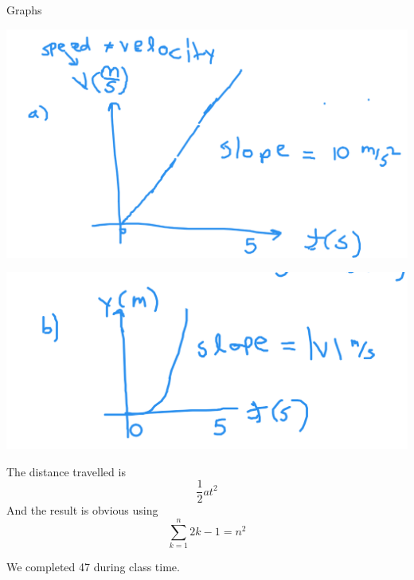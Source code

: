 \documentclass[11pt]{scrartcl}
\begin{document}
\begin{soln}
  Graphs
  \begin{center}\includegraphics[scale=0.3]{velocity.png}\end{center}
  \begin{center}\includegraphics[scale=0.3]{position.png}\end{center}
\end{soln}
\begin{example}
  [Problem 40]
\end{example}
\begin{soln}
  The distance travelled is
  $$\frac{1}{2}at^2$$
  And the result is obvious using
  $$\sum_{k=1}^n 2k-1=n^2$$
\end{soln}
We completed 47 during class time.
\end{document}
